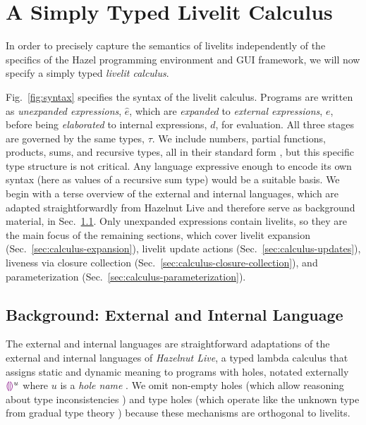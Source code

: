 \section{A Simply Typed Livelit Calculus}\label{sec:livelit-calculus}
In order to precisely capture the semantics of livelits  
independently 
of the specifics of the Hazel programming environment and GUI
framework, we will now specify a simply typed \emph{livelit calculus}.

Fig.~\ref{fig:syntax} specifies the syntax of the livelit calculus. 
Programs are written as \emph{unexpanded expressions}, $\hat e$, which are \emph{expanded} to 
\emph{external expressions}, $e$, before being \emph{elaborated} 
to internal expressions, $d$, for evaluation. All three stages are governed 
by the same types, $\tau$. We include numbers, partial functions, products, sums, and recursive
types, all in their standard form \cite{pfpl}, but this specific type structure is not critical. 
Any language expressive
enough to encode its own syntax (here as values of a recursive sum type)
would be a suitable basis. We begin with a terse
overview of the external and internal languages, 
which are adapted straightforwardly from Hazelnut Live \cite{HazelnutLive} and therefore 
serve as background material, in Sec.~\ref{sec:external-and-internal-lang}.
Only unexpanded expressions contain 
livelits, so they are the main focus of the remaining sections,
which cover livelit expansion (Sec.~\ref{sec:calculus-expansion}), 
livelit update actions (Sec.~\ref{sec:calculus-updates}), 
liveness via closure collection (Sec.~\ref{sec:calculus-closure-collection}), 
and parameterization (Sec.~\ref{sec:calculus-parameterization}).


\subsection{Background: External and Internal Language}\label{sec:external-and-internal-lang}
The external and internal languages are straightforward adaptations of the 
external and internal languages of \emph{Hazelnut Live}, 
a typed lambda calculus that assigns static and dynamic meaning to programs with holes,
notated externally $\textcolor{violet}{\llparenthesis}\textcolor{violet}{\rrparenthesis}^{u}$ where $u$ is a \emph{hole name} \cite{HazelnutLive}.
We omit non-empty holes (which allow reasoning about type inconsistencies \cite{Hazelnut}) and type holes
(which operate like the unknown type from gradual type theory \cite{Siek06a,Hazelnut})
because these mechanisms are orthogonal to livelits.

